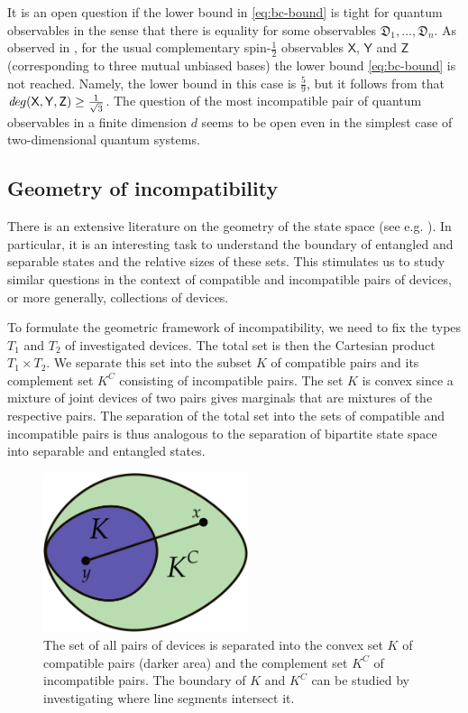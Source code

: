 \documentclass[12pt]{article}
\theoremstyle{definition}
\newcommand{\half}{\tfrac{1}{2}} %
\newcommand{\Dev}{\mathfrak{D}} %
\def\deg{\textit de\kern-.5pt g}
\begin{document}
It is an open question if the lower bound in \eqref{eq:bc-bound} is tight for quantum observables in the sense that there is equality for some observables $\Dev_1,\ldots,\Dev_n$. 
As observed in \cite{DaMaSa01}, for the usual complementary spin-$\half$ observables $\mathsf{X}$, $\mathsf{Y}$ and $\mathsf{Z}$ (corresponding to three mutual unbiased bases) the lower bound \eqref{eq:bc-bound} is not reached.
Namely, the lower bound in this case is $\frac{5}{9}$, but it follows from \cite{Busch86} that
$\deg(\mathsf{X},\mathsf{Y},\mathsf{Z}) \geq \frac{1}{\sqrt{3}}$. 
The question of the most incompatible pair of quantum observables in a finite dimension $d$ seems to be open even in the simplest case of two-dimensional quantum systems.

\subsection{Geometry of incompatibility}

There is an extensive literature on the geometry of the state space (see e.g. \cite{GQS06}).
In particular, it is an interesting task to understand the boundary of entangled and separable states and the relative sizes of these sets.
This stimulates us to study similar questions in the context of compatible and incompatible pairs of devices, or more generally, collections of devices.

To formulate the geometric framework of incompatibility, we need to fix the types $T_1$ and $T_2$ of investigated devices.
The total set is then the Cartesian product $T_1\times T_2$.
We separate this set into the subset $K$ of compatible pairs and its complement set $K^C$ consisting of incompatible pairs.
The set $K$ is convex since a mixture of joint devices of two pairs gives marginals that are mixtures of the respective pairs. 
The separation of the total set into the sets of compatible and incompatible pairs is thus analogous to the separation of bipartite state space into separable and entangled states.

\begin{figure}\begin{center}
\includegraphics[width=6cm]{fig_geometry.png}
\caption{The set of all pairs of devices is separated into the convex set $K$ of compatible pairs (darker area) and the complement set $K^C$ of incompatible pairs.
The boundary of $K$ and $K^C$ can be studied by investigating where line segments intersect it.}
\label{fig:geometry}
\end{center}
\end{figure}
\end{document}
